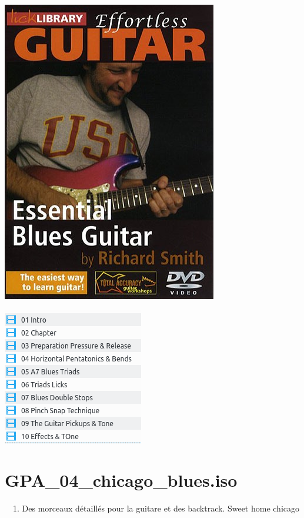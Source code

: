 \documentclass[a4paper]{book}
\begin{document}
\begin{center}
\includegraphics[width=9.393cm,height=13.229cm]{lebluessupportsmethodes-img61.jpg}
\end{center}






\begin{center}
\includegraphics[width=6.137cm,height=5.978cm]{lebluessupportsmethodes-img62.png}
\end{center}
\clearpage


\section[GPA\_04\_chicago\_blues.iso]{GPA\_04\_chicago\_blues.iso}
\hypertarget{RefHeadingToc134973218262}{}\ \  1. Des morceaux
d\'etaill\'es pour la guitare et des backtrack. Sweet home chicago
\end{document}
